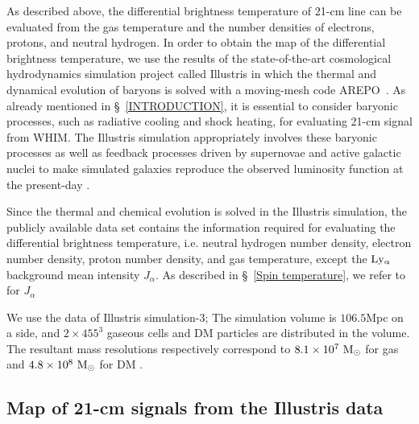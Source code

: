 \documentclass[a4paper,fleqn,usenatbib,useAMS]{mnras}
\begin{document}
As described above, the differential brightness temperature of 21-cm line can be evaluated from the gas temperature and the number densities of electrons, protons, and neutral hydrogen. 
In order to obtain the map of the differential brightness temperature,
we use the results of the state-of-the-art cosmological hydrodynamics
simulation project called Illustris in which the thermal and dynamical evolution of baryons is solved with a moving-mesh code AREPO~\citep{Springel2010, Genel2014,Vogelsberger2014}. 
As already mentioned in \S~\ref{INTRODUCTION}, it is essential to consider baryonic processes, such as radiative cooling and shock heating, for evaluating  21-cm signal from WHIM. 
The Illustris simulation appropriately involves these baryonic processes as well as feedback processes driven by supernovae and active galactic nuclei to make simulated galaxies reproduce the observed luminosity function at the present-day \citet{Vogelsberger2013,Torrey2014}. 

Since the thermal and chemical evolution is solved in the Illustris
simulation, the publicly available data set contains the information
required for evaluating the differential brightness temperature,
i.e. neutral hydrogen number density, electron number density, proton
number density, and gas temperature, except the $\rm Ly_\alpha$
background mean intensity $J_{\alpha}$. 
As described in \S~\ref{Spin temperature}, we refer to \citet{HM2012} for $J_{\alpha}$

We use the data of Illustris simulation-3; 
The simulation volume is $106.5$Mpc on a side, and $2\times455^3$ gaseous cells and DM particles are distributed in the volume.
The resultant mass resolutions respectively correspond to $8.1\times 10^7~{\rm M_{\odot}}$ for gas and $4.8\times 10^8~{\rm M_{\odot}}$ for DM \citep{Nelson2015}.  

\subsection{Map of 21-cm signals from the Illustris data}
\end{document}
